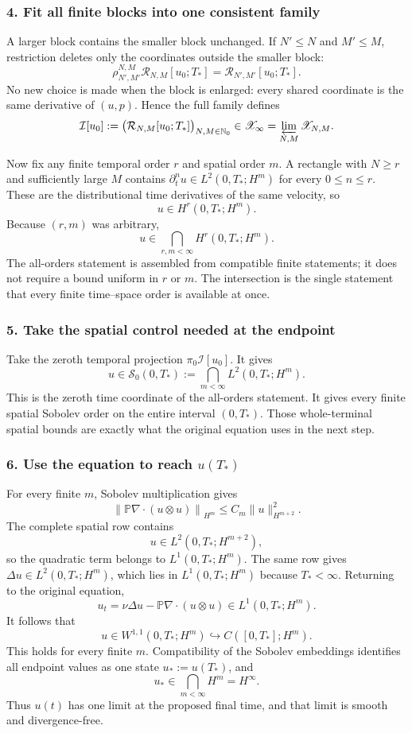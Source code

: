 \documentclass[11pt]{article}
\theoremstyle{definition}
\theoremstyle{remark}
\newcommand{\Nzero}{\mathbb N_0}
\newcommand{\cI}{\mathcal I}
\newcommand{\cR}{\mathcal R}
\begin{document}
\subsubsection*{4. Fit all finite blocks into one consistent family}

A larger block contains the smaller block unchanged.  If \(N'\le N\) and
\(M'\le M\), restriction deletes only the coordinates outside the smaller
block:
\[
\rho_{N',M'}^{N,M}\cR_{N,M}[u_0;T_*]
=\cR_{N',M'}[u_0;T_*].
\]
No new choice is made when the block is enlarged: every shared coordinate is
the same derivative of \((u,p)\).  Hence the full family defines
\[
\cI[u_0]
:=\bigl(\cR_{N,M}[u_0;T_*]\bigr)_{N,M\in\Nzero}
\in
\mathscr X_\infty
=\varprojlim_{N,M}\mathscr X_{N,M}.
\]

Now fix any finite temporal order \(r\) and spatial order \(m\).  A rectangle
with \(N\ge r\) and sufficiently large \(M\) contains
\(\partial_t^n u\in L^2(0,T_*;H^m)\) for every \(0\le n\le r\).  These are
the distributional time derivatives of the same velocity, so
\[
u\in H^r(0,T_*;H^m).
\]
Because \((r,m)\) was arbitrary,
\[
u\in\bigcap_{r,m<\infty}H^r(0,T_*;H^m).
\]
The all-orders statement is assembled from compatible finite statements; it
does not require a bound uniform in \(r\) or \(m\).  The intersection is the
single statement that every finite time--space order is available at once.

\subsubsection*{5. Take the spatial control needed at the endpoint}

Take the zeroth temporal projection \(\pi_0\cI[u_0]\).  It gives
\[
\boxed{
u\in
\mathscr S_0(0,T_*)
:=
\bigcap_{m<\infty}
L^2(0,T_*;H^m).
}
\]
This is the zeroth time coordinate of the all-orders statement.  It gives
every finite spatial Sobolev order on the entire interval \((0,T_*)\).  Those
whole-terminal spatial bounds are exactly what the original equation uses in
the next step.

\subsubsection*{6. Use the equation to reach \(u(T_*)\)}

For every finite \(m\), Sobolev multiplication gives
\[
\left\|
\mathbb P\nabla\cdot(u\otimes u)
\right\|_{H^m}
\le
C_m
\|u\|_{H^{m+2}}^2.
\]
The complete spatial row contains
\[
u\in L^2(0,T_*;H^{m+2}),
\]
so the quadratic term belongs to \(L^1(0,T_*;H^m)\).  The same row gives
\(\Delta u\in L^2(0,T_*;H^m)\), which lies in \(L^1(0,T_*;H^m)\) because
\(T_*<\infty\).  Returning to the original equation,
\[
u_t
=\nu\Delta u-\mathbb P\nabla\cdot(u\otimes u)
\in L^1(0,T_*;H^m).
\]
It follows that
\[
u\in W^{1,1}(0,T_*;H^m)
\hookrightarrow
C([0,T_*];H^m).
\]
This holds for every finite \(m\).  Compatibility of the Sobolev embeddings
identifies all endpoint values as one state \(u_*:=u(T_*)\), and
\[
\boxed{
u_*\in
\bigcap_{m<\infty}H^m
=
H^\infty.
}
\]
Thus \(u(t)\) has one limit at the proposed final time, and that limit is
smooth and divergence-free.
\end{document}
